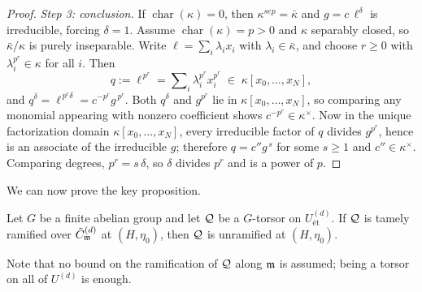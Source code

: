 \begin{proof}
    \emph{Step 3: conclusion.} If $\operatorname{char}(\kappa) = 0$, then
    $\kappa^{sep} = \bar{\kappa}$ and $g = c\,\ell^\delta$ is irreducible, forcing
    $\delta = 1$. Assume $\operatorname{char}(\kappa) = p > 0$ and $\kappa$ separably closed,
    so $\bar{\kappa}/\kappa$ is purely inseparable. Write $\ell = \sum_i \lambda_i x_i$ with
    $\lambda_i \in \bar{\kappa}$, and choose $r \geq 0$ with $\lambda_i^{p^r} \in \kappa$ for
    all $i$. Then
    \[ q := \ell^{\,p^r} = \sum\nolimits_i \lambda_i^{p^r} x_i^{p^r}
       \; \in \; \kappa[x_0, \dots, x_N], \]
    and $q^{\delta} = \ell^{\,p^r \delta} = c^{-p^r} g^{\,p^r}$. Both $q^\delta$ and
    $g^{p^r}$ lie in $\kappa[x_0, \dots, x_N]$, so comparing any monomial appearing with
    nonzero coefficient shows $c^{-p^r} \in \kappa^\times$. Now in the unique factorization
    domain $\kappa[x_0, \dots, x_N]$, every irreducible factor of $q$ divides $g^{p^r}$, hence
    is an associate of the irreducible $g$; therefore $q = c'' g^{\,s}$ for some $s \geq 1$ and
    $c'' \in \kappa^\times$. Comparing degrees, $p^r = s\,\delta$, so $\delta$ divides $p^r$
    and is a power of $p$.
\end{proof}

We can now prove the key proposition.

\begin{prop}\label{prop:tame_at_boundary_implies_unramified_r2}
    Let $G$ be a finite abelian group and let $\mathcal{Q}$ be a $G$-torsor on $U^{(d)}_{\text{\'et}}$.
    If $\mathcal{Q}$ is tamely ramified over $\tilde{C}_{\mathfrak{m}}^{(d)}$ at $(H, \eta_0)$, then $\mathcal{Q}$ is unramified at
    $(H, \eta_0)$.
\end{prop}

Note that no bound on the ramification of $\mathcal{Q}$ along $\mathfrak{m}$ is assumed;
being a torsor on all of $U^{(d)}$ is enough.

